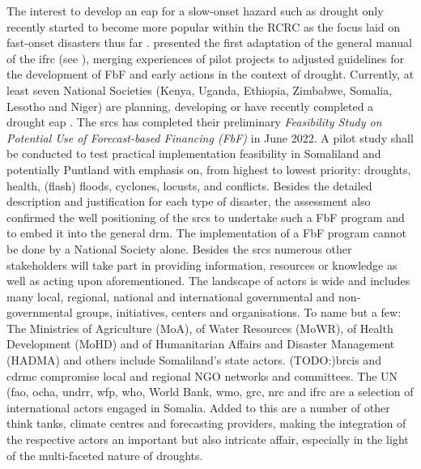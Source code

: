 The interest to develop an \acrshort*{eap} for a slow-onset hazard such as drought only recently started to become more popular within the RCRC as the focus laid on fast-onset disasters thus far \autocite{rcrcFORECASTBASEDFINANCINGEARLY2020}. \autocite{rcrcFORECASTBASEDFINANCINGEARLY2020} presented the first adaptation of the general manual of the \acrshort{ifrc} (see \autocite{ifrcFbFPractitionersManual2023b}), merging experiences of pilot projects to adjusted guidelines for the development of FbF and early actions in the context of drought. Currently, at least seven National Societies (Kenya, Uganda, Ethiopia, Zimbabwe, Somalia, Lesotho and Niger) are planning, developing or have recently completed a drought \acrshort*{eap} \autocite{lesothoredcrosssocietyEARLYACTIONPROTOCOL2022,nigerredcrosssocietyNigerDroughtEarly2021,rcrcFORECASTBASEDFINANCINGEARLY2020}.
The \acrfull*{srcs} has completed their preliminary \textit{Feasibility Study on Potential Use of Forecast-based Financing (FbF)} in June 2022. A pilot study shall be conducted to test practical implementation feasibility in Somaliland and potentially Puntland with emphasis on, from highest to lowest priority: droughts, health, (flash) floods, cyclones, locusts, and conflicts. Besides the detailed description and justification for each type of disaster, the assessment also confirmed the well positioning of the \acrshort*{srcs} to undertake such a FbF program and to embed it into the general \acrlong*{drm}.
The implementation of a FbF program cannot be done by a National Society alone. Besides the \acrshort*{srcs} numerous other stakeholders will take part in providing information, resources or knowledge as well as acting upon aforementioned. The landscape of actors is wide and includes many local, regional, national and international governmental and non-governmental groups, initiatives, centers and organisations. To name but a few: The Ministries of Agriculture (MoA), of Water Resources (MoWR), of Health Development (MoHD) and of Humanitarian Affairs and Disaster Management (HADMA) and others include Somaliland's state actors. (TODO:)\acrfull{brcis} and \acrfull{cdrmc} compromise local and regional NGO networks and committees. The UN (\acrshort{fao}, \acrshort{ocha}, \acrshort{undrr}, \acrshort{wfp}, \acrshort{who}, World Bank, \acrshort{wmo}, \acrshort{grc}, \acrshort{nrc} and \acrshort{ifrc} are a selection of international actors engaged in Somalia. Added to this are a number of other think tanks, climate centres and forecasting providers, making the integration of the respective actors an important but also intricate affair, especially in the light of the multi-faceted nature of droughts\autocite{rcrcFORECASTBASEDFINANCINGEARLY2020,somaliredcrescentsocietyFeasibilityStudyPotential2022}.

